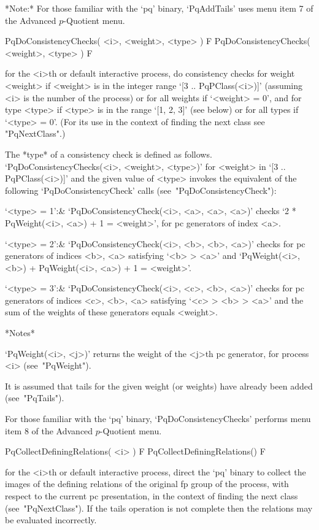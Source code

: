 *Note:*
For those familiar with the `pq' binary, `PqAddTails' uses menu item 7 of
the Advanced $p$-Quotient menu.

\>PqDoConsistencyChecks( <i>, <weight>, <type> ) F
\>PqDoConsistencyChecks( <weight>, <type> ) F

for the <i>th or default interactive  {\ANUPQ}  process,  do  consistency
checks for weight <weight> if <weight> is in the  integer  range  `[3  ..
PqPClass(<i>)]' (assuming <i> is the number of the process)  or  for  all
weights if `<weight> = 0', and for type <type> if <type> is in the  range
`[1, 2, 3]' (see below) or for all types if `<type> = 0'. (For its use in
the context of finding the next class see "PqNextClass".)

The  *type*   of   a   consistency   check   is   defined   as   follows.
`PqDoConsistencyChecks(<i>, <weight>, <type>)' for  <weight>  in  `[3  ..
PqPClass(<i>)]' and the given value of <type> invokes the  equivalent  of
the following `PqDoConsistencyCheck' calls (see~"PqDoConsistencyCheck"):

\beginitems

`<type> = 1':&
`PqDoConsistencyCheck(<i>, <a>, <a>, <a>)' checks `2 * PqWeight(<i>, <a>)
+ 1 = <weight>', for pc generators of index <a>.

`<type> = 2':&
`PqDoConsistencyCheck(<i>, <b>, <b>, <a>)' checks for  pc  generators  of
indices <b>, <a>  satisfying  `<b>  >  <a>'  and  `PqWeight(<i>,  <b>)  +
PqWeight(<i>, <a>) + 1 = <weight>'.

`<type> = 3':&
`PqDoConsistencyCheck(<i>, <c>, <b>, <a>)' checks for  pc  generators  of
indices <c>, <b>, <a> satisfying `<c> > <b> > <a>' and  the  sum  of  the
weights of these generators equals <weight>.

\enditems

*Notes*

`PqWeight(<i>, <j>)' returns the weight of the <j>th  pc  generator,  for
process <i> (see~"PqWeight").

It is assumed that tails for the given weight (or weights)  have  already
been added (see~"PqTails").

For those familiar with the `pq' binary, `PqDoConsistencyChecks' performs
menu item 8 of the Advanced $p$-Quotient menu.

\>PqCollectDefiningRelations( <i> ) F
\>PqCollectDefiningRelations() F

for the <i>th or default interactive {\ANUPQ} process,  direct  the  `pq'
binary to collect the images of the defining relations of the original fp
group of the process, with respect to the current pc presentation, in the
context of finding the  next  class  (see~"PqNextClass").  If  the  tails
operation  is  not  complete  then  the  relations   may   be   evaluated
incorrectly.


